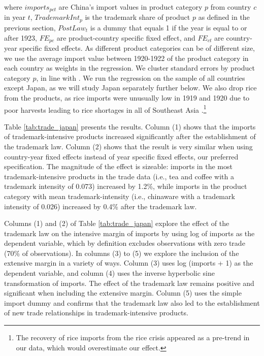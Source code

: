 \documentclass[12pt]{article}
\begin{document}
\noindent where $imports_{pct}$ are China's import values in product category $p$ from country $c$ in year $t$, $TrademarkInt_{p}$ is the trademark share of product $p$ as defined in the previous section, $PostLaw_t$ is a dummy that equals 1 if the year is equal to or after 1923,  $FE_{pc}$ are product-country specific fixed effect, and $FE_{ct}$ are country-year specific fixed effects. As different product categories can be of different size, we use the average import value between 1920-1922 of the product category in each country as weights in the regression. We cluster standard errors by product category $p$, in line with \cite{Bertrand2004}. We run the regression on the sample of all countries except Japan, as we will study Japan separately further below. We also drop rice from the products, as rice imports were unusually low in 1919 and 1920 due to poor harvests leading to rice shortages in all of Southeast Asia \citep{Kratoska1990}.\footnote{The recovery of rice imports from the rice crisis appeared as a pre-trend in our data, which would overestimate our effect.}  

Table \ref{tab:trade_japan} presents the results. Column (1) shows that the imports of trademark-intensive products increased significantly after the establishment of the trademark law. Column (2) shows that the result is very similar when using country-year fixed effects instead of year specific fixed effects, our preferred specification.  The magnitude of the effect is sizeable: imports in the most trademark-intensive products in the trade data (i.e., tea and coffee with a trademark intensity of 0.073) increased by 1.2\%, while imports in the product category with mean trademark-intensity (i.e., chinaware with a trademark intensity of 0.026) increased by 0.4\% after the trademark law.

Columns (1) and (2) of Table \ref{tab:trade_japan} explore the effect of the trademark law on the intensive margin of imports by using log of imports as the dependent variable, which by definition excludes observations with zero trade (70\% of observations). In columns (3) to (5) we explore the inclusion of the extensive margin in a variety of ways. Column (3) uses log (imports + 1) as the dependent variable, and column (4) uses the inverse hyperbolic sine transformation of imports. The effect of the trademark law remains positive and significant when including the extensive margin. Column (5) uses the simple import dummy and confirms that the trademark law also led to the establishment of new trade relationships in trademark-intensive products.
\end{document}

